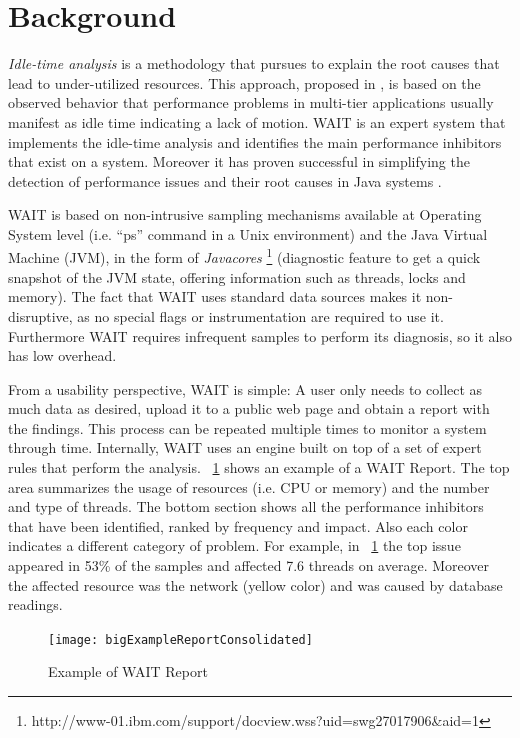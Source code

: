 \documentclass[runningheads,a4paper]{llncs}
\begin{document}
\section{Background}
\label{Background}
\vspace{-7pt}
\emph{Idle-time analysis} is a methodology that pursues to explain the root
causes that lead to under-utilized resources. This approach, proposed in
\cite{Altman2010}, is based on the observed behavior that performance problems in multi-tier
applications usually manifest as idle time indicating a lack of motion.
WAIT is an expert system that implements the idle-time analysis and identifies
the main performance inhibitors that exist on a system. Moreover it has proven successful in simplifying the detection of performance issues and their root causes in Java
systems \cite{Altman2010,Wu1}.

WAIT is based on non-intrusive sampling mechanisms available at
Operating System level (i.e. ``ps'' command in a Unix environment) and the Java
Virtual Machine (JVM), in the form of \emph{Javacores}
\footnote{http://www-01.ibm.com/support/docview.wss?uid=swg27017906\&aid=1}
(diagnostic feature to get a quick snapshot of the JVM state, offering
information such as threads, locks and memory). The fact that WAIT uses standard
data sources makes it non-disruptive, as no special flags or instrumentation are
required to use it. Furthermore WAIT requires infrequent samples to perform its
diagnosis, so it also has low overhead.

From a usability perspective, WAIT is simple: A user only needs to
collect as much data as desired, upload it to a public web page and obtain a
report with the findings. This process can be repeated multiple times to monitor a
system through time. Internally, WAIT uses an engine built on top of a set of 
expert rules that perform the analysis. \figurename ~\ref{fig_WAITReport} shows an
example of a WAIT Report. The top area summarizes the usage of resources (i.e.
CPU or memory) and the number and type of threads. The bottom section shows all
the performance inhibitors that have been identified, ranked by frequency and impact. 
Also each color indicates a different category of problem. For example, in
\figurename ~\ref{fig_WAITReport} the top issue appeared in 53\% of the samples
and affected 7.6 threads on average. Moreover the affected resource was the
network (yellow color) and was caused by database readings.

\begin{figure}[!h]
\centering
\texttt{[image: bigExampleReportConsolidated]}
\caption{Example of WAIT Report}
\label{fig_WAITReport}
\end{figure}
\end{document}
